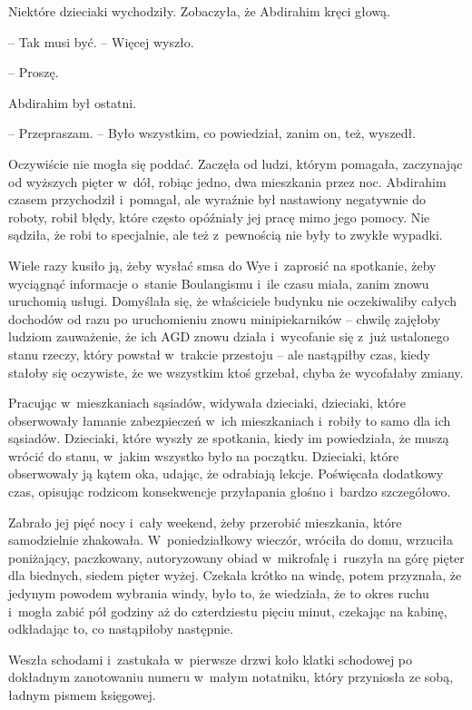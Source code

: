 \documentclass[oneside,polish,11pt,sfheadings]{mwbk}
\begin{document}
Niektóre dzieciaki wychodziły. Zobaczyła, że Abdirahim kręci głową.

-- Tak musi być. -- Więcej wyszło.

-- Proszę.

Abdirahim był ostatni.

-- Przepraszam. -- Było wszystkim, co powiedział, zanim on, też, wyszedł.

Oczywiście nie mogła się poddać. Zaczęła od ludzi, którym pomagała,
zaczynając od wyższych pięter w~dół, robiąc jedno, dwa mieszkania przez
noc. Abdirahim czasem przychodził i~pomagał, ale wyraźnie był nastawiony
negatywnie do roboty, robił błędy, które często opóźniały jej pracę mimo
jego pomocy. Nie sądziła, że robi to specjalnie, ale też z~pewnością nie
były to zwykłe wypadki.

Wiele razy kusiło ją, żeby wysłać smsa do Wye i~zaprosić na spotkanie,
żeby wyciągnąć informacje o~stanie Boulangismu i~ile czasu miała, zanim
znowu uruchomią usługi. Domyślała się, że właściciele budynku nie
oczekiwaliby całych dochodów od razu po uruchomieniu znowu
minipiekarników -- chwilę zajęłoby ludziom zauważenie, że ich AGD znowu
działa i~wycofanie się z~już ustalonego stanu rzeczy, który powstał w~trakcie przestoju -- ale nastąpiłby czas, kiedy stałoby się oczywiste, że
we wszystkim ktoś grzebał, chyba że wycofałaby zmiany.

Pracując w~mieszkaniach sąsiadów, widywała dzieciaki, dzieciaki, które
obserwowały łamanie zabezpieczeń w~ich mieszkaniach i~robiły to samo dla
ich sąsiadów. Dzieciaki, które wyszły ze spotkania, kiedy im
powiedziała, że muszą wrócić do stanu, w~jakim wszystko było na
początku. Dzieciaki, które obserwowały ją kątem oka, udając, że
odrabiają lekcje. Poświęcała dodatkowy czas, opisując rodzicom
konsekwencje przyłapania głośno i~bardzo szczegółowo.

Zabrało jej pięć nocy i~cały weekend, żeby przerobić mieszkania, które
samodzielnie zhakowała. W~poniedziałkowy wieczór, wróciła do domu,
wrzuciła poniżający, paczkowany, autoryzowany obiad w~mikrofalę i~ruszyła na górę pięter dla biednych, siedem pięter wyżej. Czekała krótko
na windę, potem przyznała, że jedynym powodem wybrania windy, było to,
że wiedziała, że to okres ruchu i~mogła zabić pół godziny aż do
czterdziestu pięciu minut, czekając na kabinę, odkładając to, co
nastąpiłoby następnie.

Weszła schodami i~zastukała w~pierwsze drzwi koło klatki schodowej po
dokładnym zanotowaniu numeru w~małym notatniku, który przyniosła ze
sobą, ładnym pismem księgowej.
\end{document}
